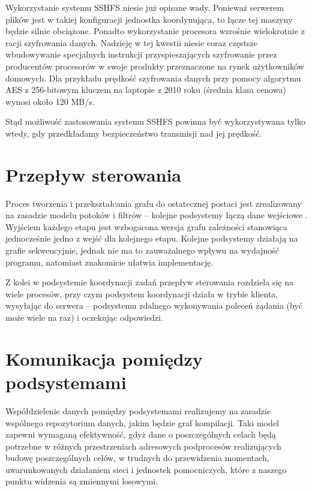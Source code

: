 \documentclass[a4paper]{article}
\begin{document}
Wykorzystanie systemu SSHFS niesie już opisane wady.
Ponieważ serwerem plików jest w takiej konfiguracji jednostka koordynująca, to łącze tej maszyny będzie silnie obciążone.
Ponadto wykorzystanie procesora wzrośnie wielokrotnie z racji szyfrowania danych.
Nadzieję w tej kwestii niesie coraz częstsze wbudowywanie specjalnych instrukcji przyspieszających szyfrowanie przez producentów procesorów w swoje produkty przeznaczone na rynek użytkowników domowych. Dla przykładu prędkość szyfrowania danych przy pomocy algorytmu AES z 256-bitowym kluczem na laptopie z 2010 roku (średnia klasa cenowa) wynosi około 120 MB/s.

Stąd możliwość zastosowania systemu SSHFS powinna być wykorzystywana tylko wtedy, gdy przedkładamy bezpieczeństwo transmisji nad jej prędkość.

\section{Przepływ sterowania}


Proces tworzenia i przekształcania grafu do ostatecznej postaci jest zrealizowany na zasadzie modelu potoków i filtrów -- kolejne podsystemy łączą dane wejściowe .
Wyjściem każdego etapu jest wzbogacona wersja grafu zależności stanowiąca jednocześnie jedno z wejść dla kolejnego etapu.
Kolejne podsystemy działają na grafie sekwencyjnie, jednak nie ma to zauważalnego wpływu na wydajność programu, natomiast znakomicie ułatwia implementację.

Z kolei w podsystemie koordynacji zadań przepływ sterowania rozdziela się na wiele procesów, przy czym podsystem koordynacji działa w trybie klienta, wysyłając do serwera -- podsystemu zdalnego wykonywania poleceń żądania (być może wiele na raz) i oczekując odpowiedzi.

\section{Komunikacja pomiędzy podsystemami}

Współdzielenie danych pomiędzy podsystemami realizujemy na zasadzie wspólnego repozytorium danych, jakim będzie graf kompilacji.
Taki model zapewni wymaganą efektywność, gdyż dane o poszczególnych celach będą potrzebne w różnych przestrzeniach adresowych podprocesów realizujących budowę poszczególnych celów, w trudnych do przewidzenia momentach, uwarunkowanych działaniem sieci i jednostek pomocniczych, które z naszego punktu widzenia są zmiennymi losowymi.
\end{document}
